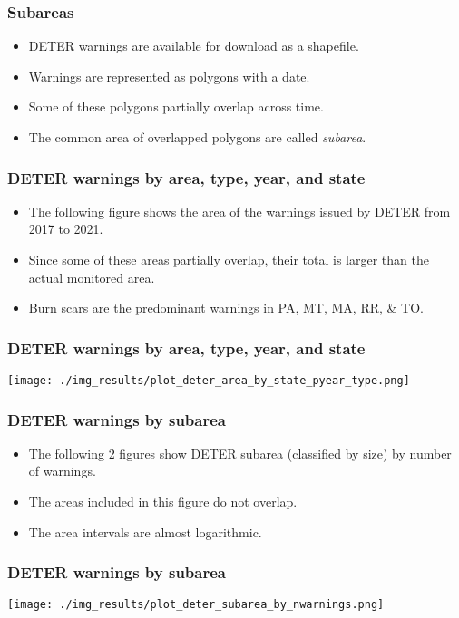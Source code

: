 \documentclass{beamer}
\begin{document}
\begin{frame}
    \frametitle{Subareas}
    \begin{itemize}
        \item DETER warnings are available for download as a shapefile.
        \item Warnings are represented as polygons with a date.
        \item Some of these polygons partially overlap across time.
        \item The common area of overlapped polygons are called \emph{subarea}. 
    \end{itemize}
\end{frame}


\begin{frame}
    \frametitle{DETER warnings by area, type, year, and state}
    \begin{itemize}
        \item The following figure shows the area of the warnings issued by 
            DETER from 2017 to 2021.
        \item Since some of these areas partially overlap, their total is
            larger than the actual monitored area.
        \item Burn scars are the predominant warnings in PA, MT, MA, RR, \& TO.
    \end{itemize}
\end{frame}

\begin{frame}
    \frametitle{DETER warnings by area, type, year, and state}
    \texttt{[image: ./img\_results/plot\_deter\_area\_by\_state\_pyear\_type.png]}
\end{frame}


\begin{frame}
    \frametitle{DETER warnings by subarea}
    \begin{itemize}
        \item The following 2 figures show DETER subarea (classified by size) 
            by number of warnings.
        \item The areas included in this figure do not overlap.
        \item The area intervals are almost logarithmic.
    \end{itemize}
\end{frame}

\begin{frame}
    \frametitle{DETER warnings by subarea}
    \texttt{[image: ./img\_results/plot\_deter\_subarea\_by\_nwarnings.png]}
\end{frame}
\end{document}

